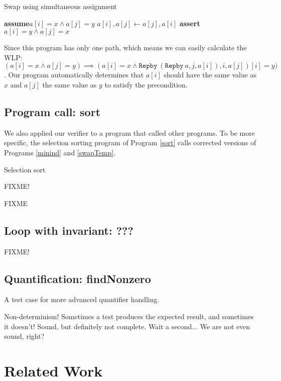 \documentclass[a4paper]{article}
\newcommand{\Assert}{\State\textbf{assert}\xspace}
\newcommand{\Assume}{\State\textbf{assume}\xspace}
\begin{document}
\begin{algorithm}\label{swapSimultaneous}
\caption{Swap using simultaneous assignment}
\begin{algorithmic}
\Assume $a[i] = x \wedge a[j] = y$
\State $a[i], a[j] \gets a[j], a[i]$
\Assert $a[i] = y \wedge a[j] = x$
\end{algorithmic}
\end{algorithm}

Since this program has only one path, which means we can easily calculate the WLP: $(a[i] = x \wedge a[j] = y) \implies (a[i] = x \wedge \texttt{Repby}\ (\texttt{Repby}\ a, j, a[i]), i, a[j])[i] = y)$. Our program automatically determines that $a[i]$ should have the same value as $x$ and $a[j]$ the same value as $y$ to satisfy the precondition.

\subsection{Program call: sort}

We also applied our verifier to a program that called other programs. To be more specific, the selection sorting program of Program \ref{sort} calls corrected versions of Programs \ref{minind} and \ref{swapTemp}.

\begin{algorithm}\label{sort}
\caption{Selection sort}
\begin{algorithmic}
FIXME!
\end{algorithmic}
\end{algorithm}
FIXME

\subsection{Loop with invariant: ???}

FIXME!

\subsection{Quantification: findNonzero}

A test case for more advanced quantifier handling.

Non-determinism! Sometimes a test produces the expected result, and sometimes it doesn't!
Sound, but definitely not complete. Wait a second... We are not even sound, right?

\section{Related Work}
\end{document}
